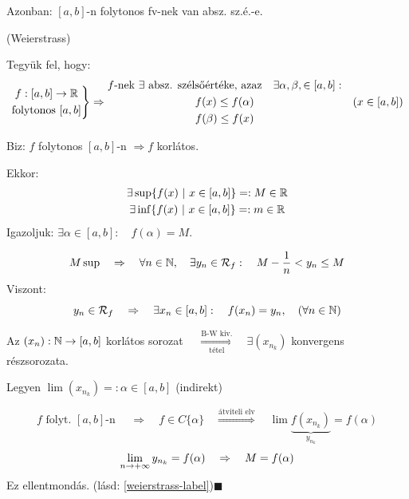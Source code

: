 \documentclass[a4paper,11.5pt]{article}
\begin{document}
		\begin{note}
			Azonban: $[a,b]$-n folytonos fv-nek van absz. sz.é.-e.
		\end{note}
		
		\begin{theorem}
			(Weierstrass)
			
			Tegyük fel, hogy:
			\[ \left.
			\begin{gathered} 
				f: [a,b]\to\mathbb{R} \\
				\text{folytonos } [a,b] 
			\end{gathered}
			\right\} \Rightarrow
			\begin{gathered}
				\text{$f$-nek $\exists$ absz. szélsőértéke, azaz\quad }\exists \alpha, \beta, \in [a,b]: \\
				f(x) \leq f(\alpha) \\
				f(\beta) \leq f(x)
			\end{gathered}\quad (x\in[a,b])\]
			
			Biz: $f$ folytonos $[a,b]$-n $\Rightarrow f$ korlátos.
			
			Ekkor:\[
			\begin{gathered}
			\exists \sup\{f(x)\ |\ x\in [a,b]\} =: M \in \mathbb{R}\\
			\exists \inf\{f(x)\ |\ x\in [a,b]\} =: m \in \mathbb{R}\\
			\end{gathered}\]
			Igazoljuk: $\exists \alpha \in [a,b]:\quad  f(\alpha) = M$.
			
			\begin{gather}
			M \sup\quad  \Rightarrow \quad \forall n \in \mathbb{N},\quad  \exists y_n\in\mathcal{R}_f:\quad  M - \frac{1}{n} < y_n \leq M 
			\label{weierstrass-label}
			\end{gather}
			Viszont: \[y_n\in\mathcal{R}_f \quad \Rightarrow\quad  \exists x_n\in [a,b]:\quad  f(x_n) = y_n,\quad (\forall n\in\mathbb{N})\]
			
			Az $(x_n): \mathbb{N}\to[a,b]$ korlátos sorozat $\quad \overset{\text{B-W kiv.}}{\underset{\text{tétel}}{\Longrightarrow}} \quad \exists (x_{n_k})$ konvergens részsorozata.
			
			Legyen $\lim(x_{n_k}) =: \alpha \in [a,b]$ (indirekt)
			
			\[f\text{ folyt. }[a,b]\text{-n }\quad \Rightarrow \quad f\in C\{\alpha\} \quad \overset{\text{átviteli elv}}{\Rightarrow}\quad 
			\lim\underbrace{f (x_{n_k})}_{y_{n_k}} = f(\alpha)\]
			\[ \displaystyle\lim_{n\to +\infty} y_{n_k} = f(\alpha) \quad \Rightarrow\quad M = f(\alpha) \]
			Ez ellentmondás. (lásd: \ref{weierstrass-label})\quad $\blacksquare$
		\end{theorem}
\end{document}
